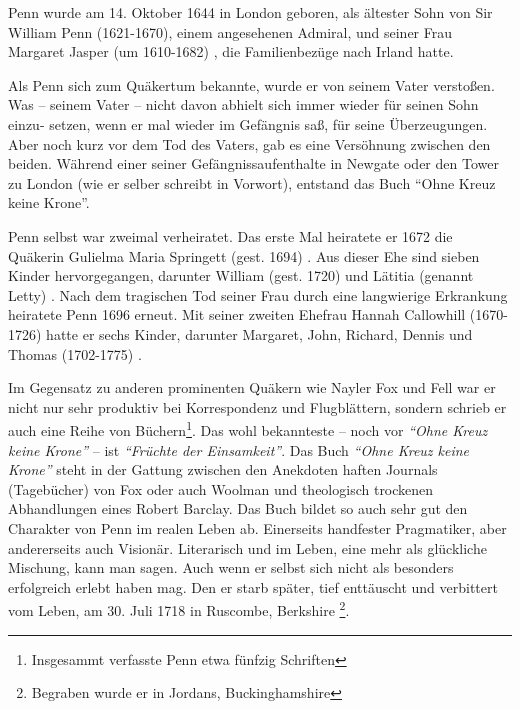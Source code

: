 \medskip

Penn wurde am 14. Oktober 1644 in London
 geboren, als ältester Sohn von Sir William Penn
(1621-1670), einem angesehenen Admiral, und
seiner Frau Margaret Jasper (um 1610-1682) ,
die Familienbezüge nach Irland  hatte.
\medskip

Als Penn sich zum Quäkertum bekannte, wurde er von seinem Vater verstoßen. Was
 -- seinem Vater -- nicht davon abhielt sich immer wieder für seinen Sohn einzu-
setzen, wenn er mal wieder im Gefängnis saß, für seine Überzeugungen. Aber noch
kurz vor dem Tod des Vaters, gab es eine Versöhnung zwischen den beiden. Während
einer seiner Gefängnissaufenthalte in Newgate  oder den Tower zu London (wie er selber schreibt in Vorwort), entstand
das Buch "`Ohne Kreuz keine Krone"'.
\medskip

Penn selbst war zweimal verheiratet. Das erste Mal heiratete er 1672 die
Quäkerin Gulielma Maria Springett (gest. 1694)
. Aus dieser Ehe sind sieben Kinder
hervorgegangen, darunter William (gest. 1720) und Lätitia (genannt Letty)
. Nach dem tragischen Tod seiner Frau
durch eine langwierige Erkrankung heiratete Penn 1696 erneut. Mit seiner zweiten
Ehefrau Hannah Callowhill (1670-1726)  hatte
er sechs Kinder, darunter Margaret, John, Richard, Dennis und Thomas (1702-1775)
.

\medskip

Im Gegensatz zu anderen prominenten Quäkern wie Nayler  Fox und Fell war er nicht nur sehr produktiv bei Korrespondenz und
Flugblättern, sondern schrieb er auch eine Reihe von
Büchern\footnote{Insgesammt verfasste Penn etwa fünfzig Schriften}.
Das wohl bekannteste -- noch vor \textit{"`Ohne Kreuz keine Krone"'} -- ist
\textit{"`Früchte der Einsamkeit"'}. Das Buch \textit{"`Ohne Kreuz keine
Krone"'} steht in der Gattung zwischen den Anekdoten haften Journals (Tagebücher) von Fox
oder auch Woolman und theologisch trockenen
Abhandlungen eines Robert Barclay. Das Buch
bildet so auch sehr gut den Charakter von Penn im realen Leben ab. Einerseits
handfester Pragmatiker, aber andererseits auch Visionär. Literarisch und im Leben,
eine mehr als glückliche Mischung, kann man sagen. Auch wenn er selbst sich
nicht als besonders erfolgreich erlebt haben mag. Den er starb später, tief
enttäuscht und verbittert vom Leben, am 30. Juli 1718 in Ruscombe, Berkshire
\footnote{Begraben wurde er in
Jordans, Buckinghamshire }.


